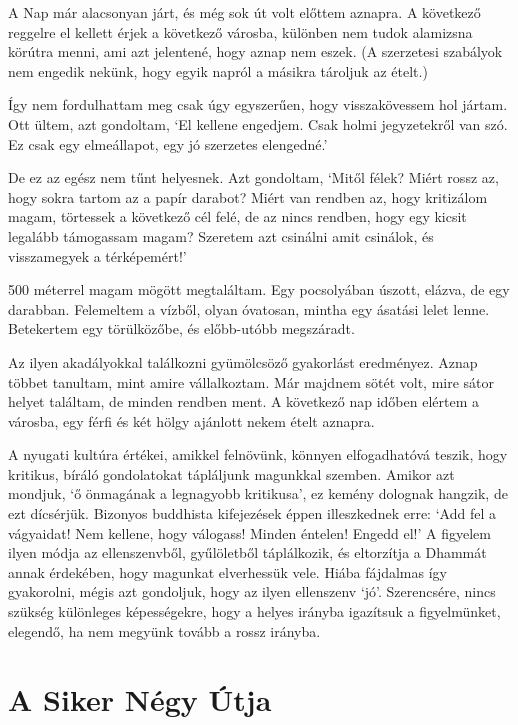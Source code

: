 A Nap már alacsonyan járt, és még sok út volt előttem aznapra. A
következő reggelre el kellett érjek a következő városba, különben nem
tudok alamizsna körútra menni, ami azt jelentené, hogy aznap nem eszek.
(A szerzetesi szabályok nem engedik nekünk, hogy egyik napról a másikra
tároljuk az ételt.)

Így nem fordulhattam meg csak úgy egyszerűen, hogy visszakövessem hol
jártam. Ott ültem, azt gondoltam, `El kellene engedjem. Csak holmi
jegyzetekről van szó. Ez csak egy elmeállapot, egy jó szerzetes
elengedné.'

De ez az egész nem tűnt helyesnek. Azt gondoltam, `Mitől félek? Miért
rossz az, hogy sokra tartom az a papír darabot? Miért van rendben az,
hogy kritizálom magam, törtessek a következő cél felé, de az nincs
rendben, hogy egy kicsit legalább támogassam magam? Szeretem azt
csinálni amit csinálok, és visszamegyek a térképemért!'

500 méterrel magam mögött megtaláltam. Egy pocsolyában úszott, elázva,
de egy darabban. Felemeltem a vízből, olyan óvatosan, mintha egy ásatási
lelet lenne. Betekertem egy törülközőbe, és előbb-utóbb megszáradt.

Az ilyen akadályokkal találkozni gyümölcsöző gyakorlást eredményez.
Aznap többet tanultam, mint amire vállalkoztam. Már majdnem sötét volt,
mire sátor helyet találtam, de minden rendben ment. A következő nap
időben elértem a városba, egy férfi és két hölgy ajánlott nekem ételt
aznapra.

A nyugati kultúra értékei, amikkel felnövünk, könnyen elfogadhatóvá
teszik, hogy kritikus, bíráló gondolatokat tápláljunk magunkkal szemben.
Amikor azt mondjuk, `ő önmagának a legnagyobb kritikusa', ez kemény
dolognak hangzik, de ezt dícsérjük. Bizonyos buddhista kifejezések éppen
illeszkednek erre: `Add fel a vágyaidat! Nem kellene, hogy válogass!
Minden éntelen! Engedd el!' A figyelem ilyen módja az ellenszenvből,
gyűlöletből táplálkozik, és eltorzítja a Dhammát annak érdekében, hogy
magunkat elverhessük vele. Hiába fájdalmas így gyakorolni, mégis azt
gondoljuk, hogy az ilyen ellenszenv `jó'. Szerencsére, nincs szükség
különleges képességekre, hogy a helyes irányba igazítsuk a figyelmünket,
elegendő, ha nem megyünk tovább a rossz irányba.

\section{A Siker Négy Útja}


